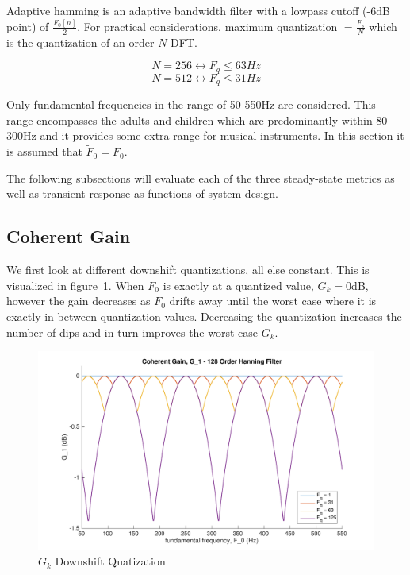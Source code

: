 \documentclass [11pt, proquest,oneside] {ganter_thesis}[2015/03/03]
\begin{document}
Adaptive hamming is an adaptive bandwidth filter with a lowpass cutoff (-6dB point) of $\frac{F_0[n]}{2}$.  For practical considerations, maximum quantization $= \frac{F_s}{N}$ which is the quantization of an order-$N$ DFT.

$$N = 256 \longleftrightarrow F_q \leq 63Hz$$
$$N = 512 \longleftrightarrow F_q \leq 31Hz$$

Only fundamental frequencies in the range of 50-550Hz are considered. This range encompasses the adults and children which are predominantly within 80-300Hz \cite{vandali2005pitch} and it provides some extra range for musical instruments.  In this section it is assumed that $\tilde{F}_0 = F_0$.

The following subsections will evaluate each of the three steady-state metrics as well as transient response as functions of system design.

\subsection{Coherent Gain}

We first look at different downshift quantizations, all else constant.  This is visualized in figure~\ref{fig:g_k_1}.  When $F_0$ is exactly at a quantized value, $G_k = 0$dB, however the gain decreases as $F_0$ drifts away until the worst case where it is exactly in between quantization values.  Decreasing the quantization increases the number of dips and in turn improves the worst case $G_k$.

\begin{figure}[!ht]
  \centering
    \includegraphics[width=1\textwidth]{g_k_1}   
    \caption{$G_k$ Downshift Quatization}\label{fig:g_k_1}
\end{figure}
\end{document}
